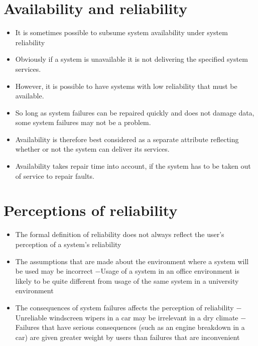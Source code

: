 \section{Availability and reliability}
\begin{itemize}
\item It is sometimes possible to subsume system availability under system reliability

  \item Obviously if a system is unavailable it is not delivering the specified system services.

\item However, it is possible to have systems with low reliability that must be available.

  \item So long as system failures can be repaired quickly and does not damage data, some system failures may not be a problem.

\item Availability is therefore best considered as a separate attribute reflecting whether or not the system can deliver its services.

\item Availability takes repair time into account, if the system has to be taken out of service to repair faults.

\end{itemize}
\section{Perceptions of reliability}
\begin{itemize}
\item The formal definition of reliability does not always reflect the user’s perception of a system’s reliability

  \item The assumptions that are made about the environment where a system will be used may be incorrect
  \newline $-$Usage of a system in an office environment is likely to be quite different from usage of the same system in a university environment
  \item The consequences of system failures affects the perception of reliability
  \newline $-$Unreliable windscreen wipers in a car may be irrelevant in a dry climate
  \newline $-$Failures that have serious consequences (such as an engine breakdown in a car) are given greater weight by users than failures that are inconvenient

\end{itemize}
